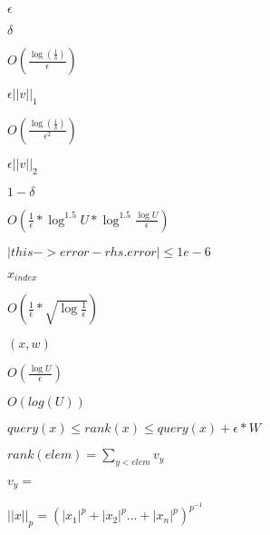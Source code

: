 \documentclass{article}
\begin{document}
$\epsilon$
\pagebreak

$\delta$
\pagebreak

$O(\frac{\log(\frac{1}{\delta})}{\epsilon})$
\pagebreak

$\epsilon||v||_1$
\pagebreak

$O(\frac{\log(\frac{1}{\delta})}{\epsilon^2})$
\pagebreak

$\epsilon||v||_2$
\pagebreak

$1 − \delta$
\pagebreak

$O(\frac{1}{\epsilon}*\log^{1.5}{U}*\log^{1.5}{\frac{\log{U}}{\epsilon}})$
\pagebreak

$|this->error - rhs.error| \leq 1e-6$
\pagebreak

$x_{index}$
\pagebreak

$O(\frac{1}{\epsilon}*\sqrt{\log{\frac{1}{\epsilon}}})$
\pagebreak

$(x,w)$
\pagebreak

$O(\frac{\log{U}}{\epsilon})$
\pagebreak

$O(log(U))$
\pagebreak

$query(x) \leq rank(x) \leq query(x) + \epsilon * W$
\pagebreak

$rank(elem) = \sum _{y < elem} v_{y}$
\pagebreak

$v_{y} = $
\pagebreak

$ ||x||_{p} = (|x_{1}|^p + |x_{2}|^p ... + |x_{n}|^p)^{p^{-1}} $
\pagebreak
\end{document}
